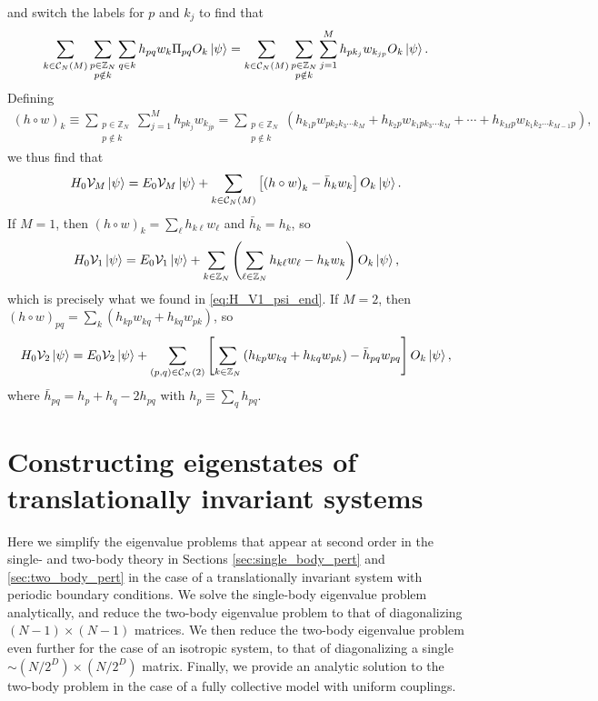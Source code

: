 \documentclass[nofootinbib,notitlepage,11pt]{revtex4-2}
\newcommand{\p}[1]{\left(#1\right)} %
\renewcommand{\sp}[1]{\left[#1\right]} %
\newcommand{\1}{\mathds{1}}
\newcommand{\C}{\mathcal{C}}
\newcommand{\V}{\mathcal{V}}
\newcommand{\ZZ}{\mathbb{Z}}
\begin{document}
and switch the labels for $p$ and $k_j$ to find that
\begin{align}
  \sum_{k\in\C_N\p{M}} \sum_{\substack{p\in\ZZ_N\\p\notin k}} \sum_{q\in k}
  h_{pq} w_k  \Pi_{pq} O_k \ket\psi
  = \sum_{k\in\C_N\p{M}} \sum_{\substack{p\in\ZZ_N\\p\notin k}}
  \sum_{j=1}^M h_{pk_j} w_{k_{jp}} O_k \ket\psi.
\end{align}
Defining
\begin{align}
  \p{h\circ w}_k
  \equiv \sum_{\substack{p\in\ZZ_N\\p\notin k}} \sum_{j=1}^M
  h_{pk_j} w_{k_{jp}}
  = \sum_{\substack{p\in\ZZ_N\\p\notin k}}
  \p{h_{k_1 p} w_{pk_2k_3\cdots k_M}
    + h_{k_2 p} w_{k_1pk_3\cdots k_M}
    + \cdots + h_{k_M p} w_{k_1k_2\cdots k_{M-1} p}},
\end{align}
we thus find that
\begin{align}
  H_0 \V_M \ket\psi
  = E_0 \V_M \ket\psi + \sum_{k\in\C_N\p{M}}
  \sp{\p{h\circ w}_k - \bar h_k w_k} O_k \ket\psi.
\end{align}
If $M=1$, then $\p{h\circ w}_k=\sum_\ell h_{k\ell}w_\ell$ and
$\bar h_k=h_k$, so
\begin{align}
  H_0 \V_1 \ket\psi
  = E_0 \V_1 \ket\psi + \sum_{k\in\ZZ_N}
  \p{\sum_{\ell\in\ZZ_N} h_{k\ell} w_\ell - h_k w_k} O_k \ket\psi,
\end{align}
which is precisely what we found in \eqref{eq:H_V1_psi_end}.  If
$M=2$, then $\p{h\circ w}_{pq}=\sum_k\p{h_{kp} w_{kq}+h_{kq}w_{pk}}$,
so
\begin{align}
  H_0 \V_2 \ket\psi
  = E_0 \V_2 \ket\psi + \sum_{\p{p,q}\in\C_N\p{2}}
  \sp{\sum_{k\in\ZZ_N}\p{h_{kp} w_{kq} + h_{kq} w_{pk}}
    - \bar h_{pq} w_{pq}}
  O_k \ket\psi,
\end{align}
where $\bar h_{pq}=h_p+h_q-2h_{pq}$ with $h_p\equiv\sum_qh_{pq}$.

\section{Constructing eigenstates of translationally invariant
  systems}
\label{sec:trans_inv}

Here we simplify the eigenvalue problems that appear at second order
in the single- and two-body theory in Sections
\ref{sec:single_body_pert} and \ref{sec:two_body_pert} in the case of
a translationally invariant system with periodic boundary conditions.
We solve the single-body eigenvalue problem analytically, and reduce
the two-body eigenvalue problem to that of diagonalizing
$\p{N-1}\times\p{N-1}$ matrices.  We then reduce the two-body
eigenvalue problem even further for the case of an isotropic system,
to that of diagonalizing a single $\sim\p{N/2^D}\times\p{N/2^D}$
matrix.  Finally, we provide an analytic solution to the two-body
problem in the case of a fully collective model with uniform
couplings.
\end{document}
